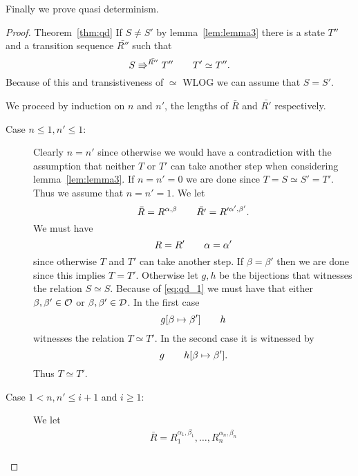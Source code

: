Finally we prove quasi determinism.
\begin{proof}{Theorem~\ref{thm:qd}}
  If $S \neq S'$ by lemma~\ref{lem:lemma3} there is a state $T''$ and a
  transition sequence $\bar{R''}$ such that
  \begin{equation}
    S \Rrightarrow^{\bar{R''}} T'' \quad\quad T' \simeq T''.
  \end{equation}
  Because of this and transistiveness of $\simeq$ WLOG we can assume that $S =
  S'$.

  We proceed by induction on $n$ and $n'$, the lengths of $\bar{R}$ and
  $\bar{R'}$ respectively.
  \begin{description}
    \item[Case $n \leq 1, n' \leq 1$:] Clearly $n = n'$ since otherwise we would
      have a contradiction with the assumption that neither $T$ or $T'$ can take
      another step when considering lemma~\ref{lem:lemma3}.
      If $n = n' = 0$ we are done since $T = S \simeq S' = T'$. Thus we assume
      that $n = n' = 1$. We let
      \begin{equation*}
        \bar{R} = R^{\alpha, \beta} \quad\quad \bar{R'} = R'^{\alpha', \beta'}.
      \end{equation*}
      We must have 
      \begin{equation} \label{eq:qd_1}
        R = R' \quad\quad \alpha = \alpha'
      \end{equation} 
      since otherwise $T$ and $T'$ can take another step.  If $\beta = \beta'$
      then we are done since this implies $T = T'$.  Otherwise let $g, h$ be the
      bijections that witnesses the relation $S \simeq S$. Because of
      \eqref{eq:qd_1} we must have that either $\beta, \beta' \in \mathcal{O}$ or
      $\beta, \beta' \in \mathcal{D}$. In the first case 
      \begin{equation}
        g[\beta \mapsto \beta'] \quad\quad h
      \end{equation}
      witnesses the relation $T \simeq T'$. In the second case it is witnessed
      by
      \begin{equation*}
        g \quad\quad h[\beta \mapsto \beta'].
      \end{equation*}
      Thus $T \simeq T'$.
    \item[Case $1 < n, n' \leq i+1$ and $i \geq 1$:] We let 
      \begin{equation*}
        \begin{gathered}
          \bar{R} = R_1^{\alpha_1, \beta_1}, \dots, R_n^{\alpha_n, \beta_n} \\

\end{gathered}
\end{equation*}
\end{description}
\end{proof}
